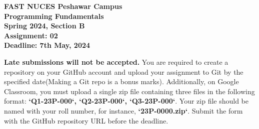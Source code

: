\documentclass[12pt]{extarticle} %
\begin{document}
\begin{titlepage}
    \centering
    \vspace*{1cm} %
    {\Huge \textbf{FAST NUCES Peshawar Campus}} \\ %
    \vspace{0.5cm}
    {\LARGE \textbf{Programming Fundamentals}} \\ %
    \vspace{0.5cm}
    {\LARGE \textbf{Spring 2024, Section B}} \\ %
    \vspace{1cm}
    {\LARGE \textbf{Assignment: 02}} \\ %
    \vspace{0.5cm}
    \vfill %
    {\Large \textbf{Deadline: 7th May, 2024}} \\ %
    \vspace{1cm} %
    {\raggedright \Large 
        \textbf{Late submissions will not be accepted.} You are required to create a repository on your GitHub account and upload your assignment to Git by the specified date(Making a Git repo is a bonus marks). Additionally, on Google Classroom, you must upload a single zip file containing three files in the following format: \textbf{`Q1-23P-000`, `Q2-23P-000`, `Q3-23P-000`}. Your zip file should be named with your roll number, for instance, \textbf{`23P-0000.zip`}. Submit the form with the GitHub repository URL before the deadline.
    }
\end{titlepage}
\end{document}
